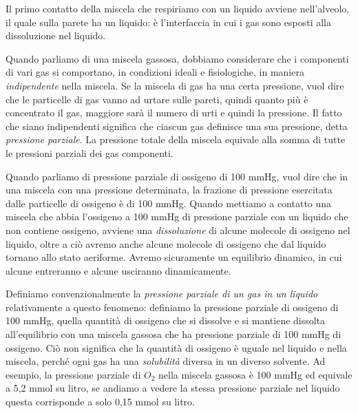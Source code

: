 \documentclass[a4paper,12pt]{article}
\begin{document}
Il primo contatto della miscela che respiriamo con un liquido avviene nell'alveolo, il quale sulla parete ha un liquido: è l'interfaccia in cui i gas sono esposti alla dissoluzione nel liquido. 

Quando parliamo di una miscela gassosa, dobbiamo considerare che i componenti di vari gas si comportano, in condizioni ideali e fisiologiche, in maniera \emph{indipendente} nella miscela. Se la miscela di gas ha una certa pressione, vuol dire che le particelle di gas vanno ad urtare sulle pareti, quindi quanto più è concentrato il gas, maggiore sarà il numero di urti e quindi la pressione. Il fatto che siano indipendenti significa che ciascun gas definisce una sua pressione, detta \emph{pressione parziale}. La pressione totale della miscela equivale alla somma di tutte le pressioni parziali dei gas componenti.

Quando parliamo di pressione parziale di ossigeno di 100 mmHg, vuol dire che in una miscela con una pressione determinata, la frazione di pressione esercitata dalle particelle di ossigeno è di 100 mmHg. Quando mettiamo a contatto una miscela che abbia l'ossigeno a 100 mmHg di pressione parziale con un liquido che non contiene ossigeno, avviene una \emph{dissoluzione} di alcune molecole di ossigeno nel liquido, oltre a ciò avremo anche alcune molecole di ossigeno che dal liquido tornano allo stato aeriforme. Avremo sicuramente un equilibrio dinamico, in cui alcune entreranno e alcune usciranno dinamicamente. 

Definiamo convenzionalmente la \emph{pressione parziale di un gas in un liquido} relativamente a questo fenomeno: definiamo la pressione parziale di ossigeno di 100 mmHg, quella quantità di ossigeno che si dissolve e si mantiene dissolta all'equilibrio con una miscela gassosa che ha pressione parziale di 100 mmHg di ossigeno. Ciò non significa che la quantità di ossigeno è uguale nel liquido e nella miscela, perché ogni gas ha una \emph{solubilità} diversa in un diverso solvente.
Ad esempio, la pressione parziale di $O_{2}$ nella miscela gassosa è 100 mmHg ed equivale a 5,2 mmol su litro, se andiamo a vedere la stessa pressione parziale nel liquido questa corrisponde a solo 0,15 mmol su litro. 
\end{document}
